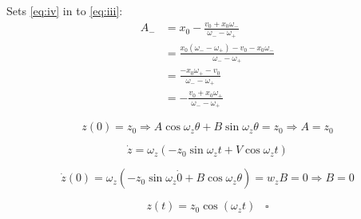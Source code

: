 \documentclass[english,notitlepage,reprint,nofootinbib]{revtex4-1}  %
\begin{document}
Sets \ref{eq:iv} in to \ref{eq:iii}:
\begin{align*}
    A_- &= x_0 - \frac{v_0 + x_0 \omega_-}{\omega_- - \omega_+} \\
    &= \frac{x_0 (\omega_- - \omega_+) - v_0 - x_0 \omega_-}{\omega_- - \omega_+} \\
    &= \frac{-x_0 \omega_+ - v_0}{\omega_- - \omega_+} \\
    &= - \frac{v_0 + x_0 \omega_+}{\omega_- - \omega_+}
\end{align*}

\begin{equation*}
    z(0) = z_0 \Rightarrow A \cos \omega_z \theta + B \sin \omega_z \theta = z_0 \Rightarrow A = z_0
\end{equation*}

\begin{equation*}
    \dot{z} = \omega_z (-z_0 \sin \omega_z t + V \cos \omega_z t)
\end{equation*}

\begin{equation*}
    \dot{z}(0) = \omega_z (- z_0 \sin \omega_z \dot 0 + B \cos \omega_z \theta) = w_z B = 0 \Rightarrow B = 0
\end{equation*}

\begin{equation*}
    z(t) = z_0 \cos (\omega_z t) \;\;\; \square
\end{equation*}

\end{document}
